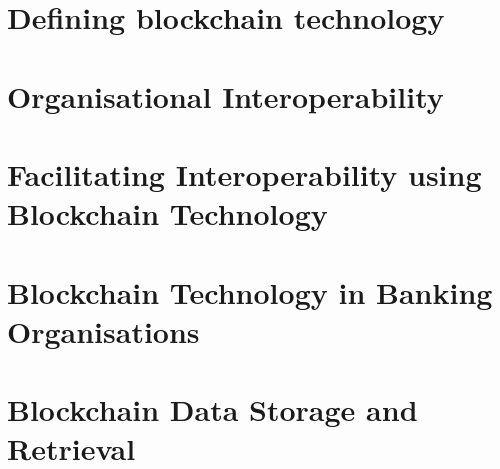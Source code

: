 \section{Defining blockchain technology}

\section{Organisational Interoperability}

\section{Facilitating Interoperability using Blockchain Technology}

\section{Blockchain Technology in Banking Organisations}

\section{Blockchain Data Storage and Retrieval}